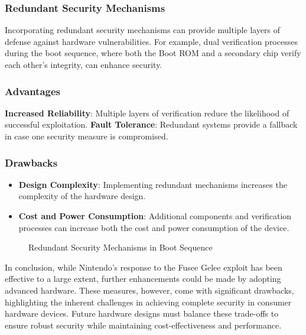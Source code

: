 \subsubsection{Redundant Security Mechanisms}
Incorporating redundant security mechanisms\cite{RedundancyEngineering2023} can provide multiple layers of defense against hardware vulnerabilities. For example, dual verification processes during the boot sequence, where both the Boot ROM and a secondary chip verify each other's integrity, can enhance security.

\subsubsection{Advantages}

\textbf{Increased Reliability}: Multiple layers of verification reduce the likelihood of successful exploitation.
\textbf{Fault Tolerance}: Redundant systems provide a fallback in case one security measure is compromised.
\subsubsection{Drawbacks}

\begin{itemize}
    \item \textbf{Design Complexity}: Implementing redundant mechanisms increases the complexity of the hardware design.
    \item \textbf{Cost and Power Consumption}: Additional components and verification processes can increase both the cost and power consumption of the device.
\end{itemize}


\begin{figure}[H]
    \centering
    \caption{Redundant Security Mechanisms in Boot Sequence}
    \label{fig:redundant_security}
\end{figure}

In conclusion, while Nintendo's response to the Fusee Gelee exploit has been effective to a large extent, further enhancements could be made by adopting advanced hardware. These measures, however, come with significant drawbacks, highlighting the inherent challenges in achieving complete security in consumer hardware devices. Future hardware designs must balance these trade-offs to ensure robust security while maintaining cost-effectiveness and performance.
